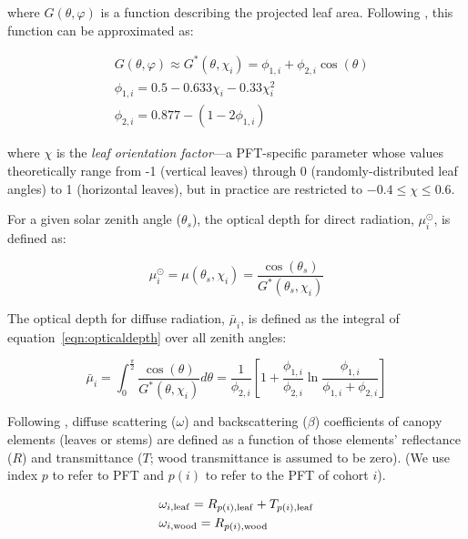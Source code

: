 where $G(\theta, \varphi)$ is a function describing the projected leaf area.
Following \citet{goudriaan_1977_crop}, this function can be approximated as:

\begin{align}
  & G(\theta, \varphi) \approx G^*(\theta, \chi_{i}) = \phi_{1, i} + \phi_{2, i} \cos(\theta) \label{eqn:gfunction} \\
  & \phi_{1, i} = 0.5 - 0.633 \chi_{i} - 0.33 \chi_{i}^{2} \\
  & \phi_{2, i} = 0.877 - \left( 1 - 2 \phi_{1, i} \right)
\end{align}

where $\chi$ is the \emph{leaf orientation factor}---a PFT-specific parameter whose values theoretically range from -1 (vertical leaves) through 0 (randomly-distributed leaf angles) to 1 (horizontal leaves), but in practice are restricted to $-0.4 \leq \chi \leq 0.6$.

For a given solar zenith angle ($\theta_{s}$), the optical depth for direct radiation, $\mu^{\odot}_{i}$, is defined as:

\begin{equation}
  \mu^{\odot}_{i} = \mu(\theta_{s}, \chi_{i}) = \frac{\cos(\theta_{s})}{G^{*}(\theta_{s}, \chi_{i})}
\end{equation}

The optical depth for diffuse radiation, $\bar{\mu}_{i}$, is defined as the integral of equation~\ref{eqn:opticaldepth} over all zenith angles:

\begin{equation}
  \bar{\mu}_{i} = \int_{0}^{\frac{\pi}{2}} \frac{\cos(\theta)}{G^{*}(\theta, \chi_{i})} d\theta
  = \frac{1}{\phi_{2,i}} \left[ 1 + \frac{\phi_{1, i}}{\phi_{2, i}} \ln \frac{\phi_{1, i}}{\phi_{1, i} + \phi_{2, i}} \right]
\end{equation}

Following \citet{sellers1985canopy}, diffuse scattering ($\omega$) and backscattering ($\beta$) coefficients of canopy elements (leaves or stems) are defined as a function of those elements' reflectance ($R$) and transmittance ($T$; wood transmittance is assumed to be zero).
(We use index $p$ to refer to PFT and $p(i)$ to refer to the PFT of cohort $i$).

\begin{align}
  & \omega_{i, \mathrm{leaf}} = R_{p(i), \mathrm{leaf}} + T_{p(i), \mathrm{leaf}}\\
  & \omega_{i, \mathrm{wood}} = R_{p(i), \mathrm{wood}}
\end{align}


